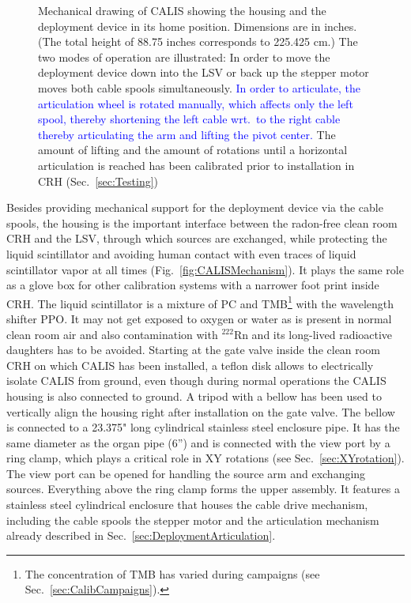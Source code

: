 \begin{figure}[htbp]
 \caption{Mechanical drawing of CALIS showing the housing and the deployment device in its home position. Dimensions are in inches. (The total height of 88.75 inches corresponds to 225.425 cm.) The two modes of operation are illustrated: In order to move the deployment device down into the LSV or back up the stepper motor moves both cable spools simultaneously. \textcolor{blue}{In order to articulate, the articulation wheel is rotated manually, which affects only the left spool, thereby shortening the left cable wrt.~to the right cable thereby articulating the arm and lifting the pivot center.} The amount of lifting and the amount of rotations until a horizontal articulation is reached has been calibrated prior to installation in CRH (Sec.~\ref{sec:Testing})\label{fig:CALISDimensions}\label{fig:CALISMechanism}\label{fig:gearDrawing}
}
\end{figure}

Besides providing mechanical support for the deployment device via the cable spools, the housing is the important interface between the radon-free clean room CRH and the LSV, through which sources are exchanged, while protecting the liquid scintillator and avoiding human contact with even traces of liquid scintillator vapor at all times (Fig.~\ref{fig:CALISMechanism}). It plays the same role as a glove box for other calibration systems with a narrower foot print inside CRH. The liquid scintillator is a mixture of PC and TMB\footnote{The concentration of TMB has varied during campaigns (see Sec.~\ref{sec:CalibCampaigns}).} with the wavelength shifter PPO\cite{vetoPaper}. It may not get exposed to oxygen or water as is present in normal clean room air and also contamination with $^{222}$Rn and its long-lived radioactive daughters has to be avoided. 
Starting at the gate valve inside the clean room CRH on which CALIS has been installed, a teflon disk allows to electrically isolate CALIS from ground, even though during normal operations the CALIS housing is also connected to ground. A tripod with a bellow has been used to vertically align the housing right after installation on the gate valve. The bellow is connected to a 23.375" long cylindrical stainless steel enclosure pipe. It has the same diameter as the organ pipe (6'') and is connected with the view port by a ring clamp, which plays a critical role in XY rotations (see Sec.~\ref{sec:XYrotation}). The view port can be opened for handling the source arm and exchanging sources. Everything above the ring clamp forms the upper assembly. It features a stainless steel cylindrical enclosure that houses the cable drive mechanism, including the cable spools the stepper motor and the articulation mechanism already described in Sec.~\ref{sec:DeploymentArticulation}. 

